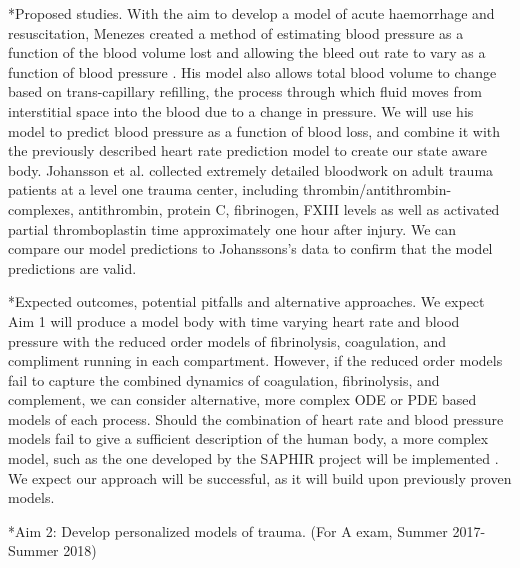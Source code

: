 \documentclass[11pt]{article}
\makeatletter
\renewcommand\subsection{\@startsection
	{subsection}{2}{0mm}
	{-0.05in}
	{-0.5\baselineskip}
	{\normalfont\normalsize\bfseries}}
\renewcommand\subsubsection{\@startsection
	{subsubsection}{2}{0mm}
	{-0.05in}
	{-0.5\baselineskip}
	{\normalfont\normalsize\bfseries}}
\renewcommand\paragraph{\@startsection
  {paragraph}{2}{0mm}
  {-0.05in}
  {-0.5\baselineskip}
  {\normalfont\normalsize\itshape}}
\makeatother
\begin{document}
\subsubsection*{Proposed studies.}
With the aim to develop a model of acute haemorrhage and resuscitation, Menezes created a method of estimating blood pressure as a function of the blood volume lost and allowing the bleed out rate to vary as a function of blood pressure  \citep{menezes1998computer}. His model also allows total blood volume to change based on trans-capillary refilling, the process through which fluid moves from interstitial space into the blood due to a change in pressure. We will use his model to predict blood pressure as a function of blood loss, and combine it with the previously described heart rate prediction model to create our state aware body. Johansson et al. collected extremely detailed bloodwork on adult trauma patients at a level one trauma center, including thrombin/antithrombin-complexes, antithrombin, protein C, fibrinogen, FXIII levels as well as activated partial thromboplastin time \citep{johansson2011disseminated} approximately one hour after injury. We can compare our model predictions to Johanssons's data to confirm that the model predictions are valid. 

\paragraph*{Expected outcomes, potential pitfalls and alternative approaches.}
We expect Aim 1 will produce  a model body with time varying heart rate and blood pressure with the reduced order models of fibrinolysis, coagulation, and compliment running in each compartment. However, if the reduced order models fail to capture the combined dynamics of coagulation, fibrinolysis, and complement, we can consider alternative, more complex ODE or PDE based models of each process. Should the combination of heart rate and blood pressure models fail to give a sufficient description of the human body, a more complex model, such as the one developed by the SAPHIR project will be implemented \citep{thomas2008saphir}. We expect our approach will be successful, as it will build upon previously proven models.

\subsection*{Aim 2: Develop personalized models of trauma. (For A exam, Summer 2017-Summer 2018)}
\end{document}
